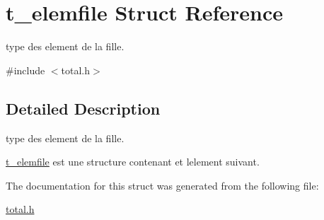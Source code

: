\hypertarget{structt__elemfile}{}\section{t\+\_\+elemfile Struct Reference}
\label{structt__elemfile}


type des element de la fille.  




{\ttfamily \#include $<$total.\+h$>$}



\subsection{Detailed Description}
type des element de la fille. 

\hyperlink{structt__elemfile}{t\+\_\+elemfile} est une structure contenant et l\textquotesingle{}element suivant. 

The documentation for this struct was generated from the following file\+:\begin{DoxyCompactItemize}
\item 
\hyperlink{total_8h}{total.\+h}\end{DoxyCompactItemize}
